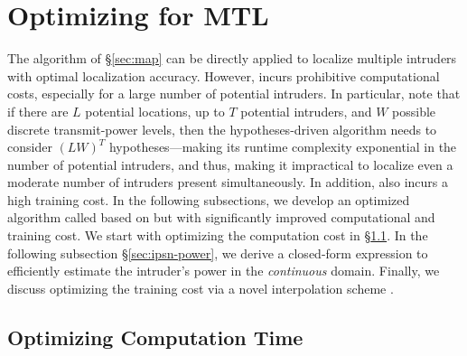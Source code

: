 \section{{\texorpdfstring{\ouralgo}: Optimizing \mll for MTL}}
\label{sec:map-time}

The \map algorithm of \S\ref{sec:map} can be directly applied to
localize multiple intruders with optimal localization accuracy.
However, \map incurs prohibitive computational costs, especially for a
large number of potential intruders.  In particular, note that if
there are $L$ potential locations, up to $T$ potential intruders, and
$W$ possible discrete transmit-power levels, then the
hypotheses-driven \map algorithm needs to consider $(LW)^T$
hypotheses---making its runtime complexity exponential in the number of
potential intruders, and thus, making it impractical to localize
even a moderate number of intruders present simultaneously.  In
addition, \mll also incurs a high training cost. In the following
subsections, we develop an optimized algorithm called \ouralgo based
on \map but with significantly improved computational and
training cost.
We start with optimizing the computation cost in \S\ref{sec:time}. In the following
  subsection \S\ref{sec:ipsn-power}, we derive a closed-form expression
  to efficiently estimate the intruder's power in the {\em continuous}
  domain.  Finally, we discuss optimizing the training cost via a
  novel interpolation scheme \ildw.


%

\subsection{Optimizing Computation Time}
\label{sec:time}


